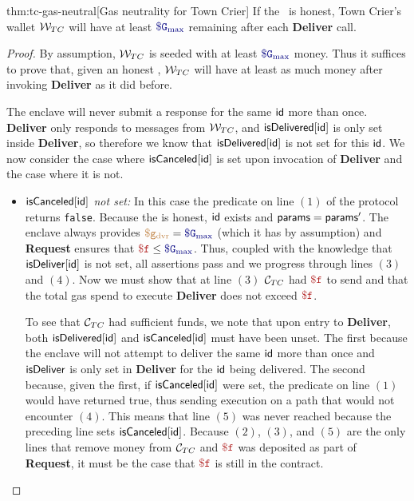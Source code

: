 \begin{retheorem}{thm:tc-gas-neutral}[Gas neutrality for Town Crier]
If the \tc~\medname is honest,
Town Crier's wallet ${\cal W}_{TC}$ will have at least $\constgasmax$ remaining after each {\bf Deliver} call.
\end{retheorem}

\begin{proof}
By assumption, ${\cal W}_{TC}$ is seeded with at least $\constgasmax$ money.
Thus it suffices to prove that, given an honest \medname, ${\cal W}_{TC}$ will have at least as much money after invoking {\bf Deliver} as it did before.

The enclave will never submit a response for the same ${\sf id}$ more than once.
{\bf Deliver} only responds to messages from ${\cal W}_{TC}$, and ${\sf isDelivered}[{\sf id}]$ is only set inside {\bf Deliver},
so therefore we know that ${\sf isDelivered}[{\sf id}]$ is not set for this ${\sf id}$.
We now consider the case where ${\sf isCanceled}[{\sf id}]$ is set upon invocation of {\bf Deliver} and the case where it is not.
\begin{itemize}

\item {\it ${\sf isCanceled}[{\sf id}]$ not set:}
In this case the predicate on line $(1)$ of the protocol returns {\tt false}.
Because the \medname is honest, ${\sf id}$ exists and ${\sf params} = {\sf params}'$.
The enclave always provides $\gasdeliver = \constgasmax$ (which it has by assumption) and {\bf Request} ensures that $\fee \leq \constgasmax$.
Thus, coupled with the knowledge that ${\sf isDeliver}[{\sf id}]$ is not set, all assertions pass and we progress through lines $(3)$ and $(4)$.
Now we must show that at line $(3)$ ${\cal C}_{TC}$ had $\fee$ to send and that the total gas spend to execute {\bf Deliver} does not exceed $\fee$.

To see that ${\cal C}_{TC}$ had sufficient funds, we note that upon entry to {\bf Deliver}, both ${\sf isDelivered}[{\sf id}]$ and ${\sf isCanceled}[{\sf id}]$ must have been unset.
The first because the enclave will not attempt to deliver the same ${\sf id}$ more than once and ${\sf isDeliver}$ is only set in {\bf Deliver} for the ${\sf id}$ being delivered.
The second because, given the first, if ${\sf isCanceled}[{\sf id}]$ were set, the predicate on line $(1)$ would have returned true, thus sending execution on a path that would not encounter $(4)$.
This means that line $(5)$ was never reached because the preceding line sets ${\sf isCanceled}[{\sf id}]$.
Because $(2)$, $(3)$, and $(5)$ are the only lines that remove money from ${\cal C}_{TC}$ and $\fee$ was deposited as part of {\bf Request},
it must be the case that $\fee$ is still in the contract.


\end{itemize}
\end{proof}
